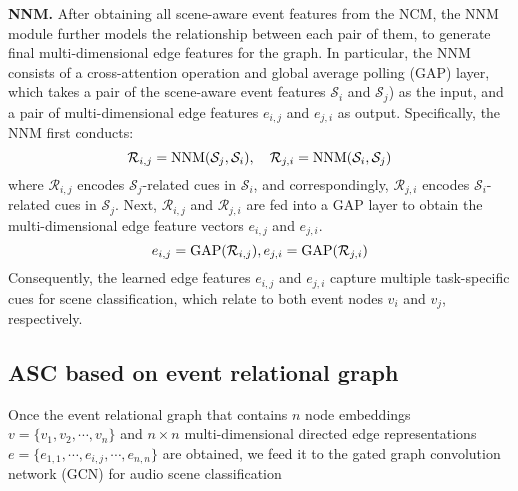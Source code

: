 \documentclass{article}
\begin{document}
\textbf{NNM.} After obtaining all scene-aware event features from the NCM, the NNM module further models the relationship between each pair of them, to generate final multi-dimensional edge features for the graph. In particular, the NNM consists of a cross-attention operation and global average polling (GAP) layer, which takes a pair of the scene-aware event features $\mathcal{S}_{i}$ and $\mathcal{S}_{j}$) as the input, and a pair of multi-dimensional edge features $e_{i, j}$ and $e_{j, i}$ as output. Specifically, the NNM first conducts: 
\begin{equation}
\setlength{\abovedisplayskip}{1pt}
\setlength{\belowdisplayskip}{1pt} 
\mathcal{R}_{i, j}=\text{NNM}(\mathcal{S}_{j}, \mathcal{S}_{i}), \quad \mathcal{R}_{j, i}=\text{NNM}(\mathcal{S}_{i}, \mathcal{S}_{j})
\end{equation} 
where $\mathcal{R}_{i, j}$ encodes $\mathcal{S}_{j}$-related cues in $\mathcal{S}_{i}$, and correspondingly, $\mathcal{R}_{j, i}$ encodes $\mathcal{S}_{i}$-related cues in $\mathcal{S}_{j}$. Next, $\mathcal{R}_{i, j}$ and $\mathcal{R}_{j, i}$ are fed into a GAP layer to obtain the multi-dimensional edge feature vectors $e_{i, j}$ and $e_{j, i}$.
\begin{equation}
\setlength{\abovedisplayskip}{1pt}
\setlength{\belowdisplayskip}{1pt} 
e_{i, j} = \text{GAP}(\mathcal{R}_{i, j}), 
e_{j, i} = \text{GAP}(\mathcal{R}_{j, i})
\end{equation} 
Consequently, the learned edge features $e_{i, j}$ and $e_{j, i}$ capture multiple task-specific cues for scene classification, which relate to both event nodes $v_i$ and $v_j$, respectively.


















\vspace{-0.4cm}
\subsection{ASC based on event relational graph}





Once the event relational graph that contains $n$ node embeddings $v = \{v_1, v_2, \cdots, v_n \}$ and $n\times n$ multi-dimensional directed edge representations $e = \{e_{1,1}, \cdots, e_{i,j}, \cdots, e_{n,n} \}$ are obtained, we feed it to the gated graph convolution network (GCN) \cite{gated_GCN} for audio scene classification
\end{document}
